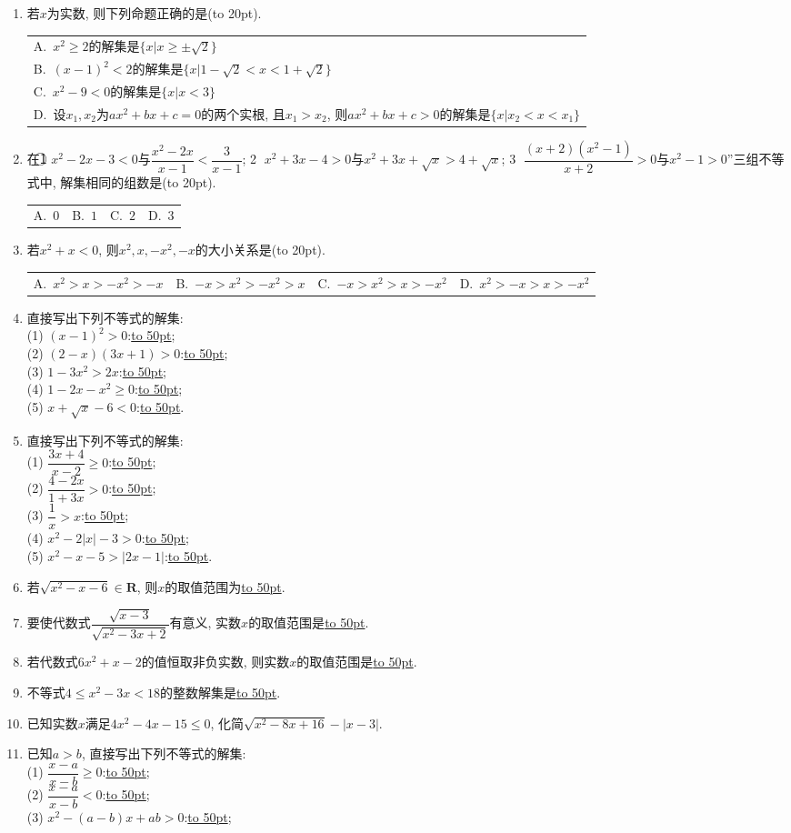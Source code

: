\documentclass[10pt,a4paper]{article}
\newcommand{\blank}[1]{\underline{\hbox to #1pt{}}}
\newcommand{\bracket}[1]{(\hbox to #1pt{})}
\newcommand{\onech}[4]{\par\begin{tabular}{p{.9\textwidth}}
A.~#1\\
B.~#2\\
C.~#3\\
D.~#4
\end{tabular}}
\newcommand{\fourch}[4]{\par\begin{tabular}{p{.23\textwidth}p{.23\textwidth}p{.23\textwidth}p{.23\textwidth}}
A.~#1 &B.~#2& C.~#3& D.~#4
\end{tabular}}
\begin{document}
\begin{enumerate}[1.]
\item 若$x$为实数, 则下列命题正确的是\bracket{20}.
\onech{$x^2\ge 2$的解集是$\{x|x\ge \pm \sqrt 2\}$}{$(x-1)^2<2$的解集是$\{x|1-\sqrt 2<x<1+\sqrt 2\}$}{$x^2-9<0$的解集是$\{x|x<3\}$}{设$x_1,x_2$为$ax^2+bx+c=0$的两个实根, 且$x_1>x_2$, 则$ax^2+bx+c>0$的解集是$\{x|x_2<x<x_1\}$}
\item 在\textcircled{1} $x^2-2x-3<0$与$\dfrac{x^2-2x}{x-1}<\dfrac 3{x-1}$; \textcircled{2} $x^2+3x-4>0$与$x^2+3x+\sqrt x>4+\sqrt x$; \textcircled{3} $\dfrac{(x+2)(x^2-1)}{x+2}>0$与$x^2-1>0$''三组不等式中, 解集相同的组数是\bracket{20}.
\fourch{$0$}{$1$}{$2$}{$3$}
\item 若$x^2+x<0$, 则$x^2,x,-x^2,-x$的大小关系是\bracket{20}.
\fourch{$x^2>x>-x^2>-x$}{$-x>x^2>-x^2>x$}{$-x>x^2>x>-x^2$}{$x^2>-x>x>-x^2$}
\item 直接写出下列不等式的解集:\\
(1) $(x-1)^2>0$:\blank{50};\\
(2) $(2-x)(3x+1)>0$:\blank{50};\\
(3) $1-3x^2>2x$:\blank{50};\\
(4) $1-2x-x^2\ge 0$:\blank{50};\\
(5) $x+\sqrt x-6<0$:\blank{50}.
\item 直接写出下列不等式的解集:\\
(1) $\dfrac{3x+4}{x-2}\ge 0$:\blank{50};\\
(2) $\dfrac{4-2x}{1+3x}>0$:\blank{50};\\
(3) $\dfrac 1x>x$:\blank{50};\\	
(4) $x^2-2|x|-3>0$:\blank{50};\\
(5) $x^2-x-5>|2x-1|$:\blank{50}.
\item 若$\sqrt{x^2-x-6}\in \mathbf{R}$, 则$x$的取值范围为\blank{50}.	
\item 要使代数式$\dfrac{\sqrt{x-3}}{\sqrt{x^2-3x+2}}$有意义, 实数$x$的取值范围是\blank{50}.
\item 若代数式$6x^2+x-2$的值恒取非负实数, 则实数$x$的取值范围是\blank{50}.
\item 不等式$4\le x^2-3x<18$的整数解集是\blank{50}.
\item 已知实数$x$满足$4x^2-4x-15\le 0$, 化简$\sqrt{x^2-8x+16}-|x-3|$.
\item 已知$a>b$, 直接写出下列不等式的解集:\\
(1) $\dfrac{x-a}{x-b}\ge 0$:\blank{50};\\
(2) $\dfrac{x-a}{x-b}<0$:\blank{50};\\
(3) $x^2-(a-b)x+ab>0$:\blank{50};\\

\end{enumerate}
\end{document}

